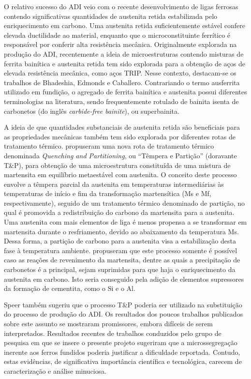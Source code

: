 O relativo sucesso do ADI veio com o recente desenvolvimento de ligas ferrosas contendo significativas quantidades de austenita retida estabilizada pelo enriquecimento em carbono. Uma austenita retida suficientemente estável confere elevada ductilidade ao material, enquanto que o microconstituinte ferrítico é responsável por conferir alta resistência mecânica. Originalmente explorada na produção do ADI, recentemente a ideia de microestruturas contendo misturas de ferrita bainítica e austenita retida tem sido explorada para a obtenção de aços de elevada resistência mecânica, como aços TRIP. Nesse contexto, destacam-se os trabalhos de Bhadeshia, Edmonds e Caballero\cite{Bhadeshia1980a,Caballero2005,Garcia-Mateo2009,GarciaMateo2005}. Contrariando o termo ausferrita utilizado em fundição, o agregado de ferrita bainítica e austenita possui diferentes terminologias na literatura, sendo frequentemente rotulado de bainita isenta de carbonetos (do inglês \textit{carbide-free bainite}), ou superbainita.

A ideia de que quantidades substanciais de austenita retida são beneficiais para as propriedades mecânicas também tem sido explorada por diferentes rotas de tratamento térmico.  propuseram uma nova rota de tratamento térmico denominada \textit{Quenching and Partitioning}, ou ``Têmpera e Partição'' (doravante T\&P), para obtenção de uma microestrutura constituída de uma mistura de martensita em equilíbrio metaestável com austenita. O conceito deste processo envolve a têmpera parcial da austenita em temperaturas intermediárias às temperaturas de início e fim da transformação martensítica (Ms e Mf, respectivamente), seguido de um tratamento térmico denominado de partição, no qual é promovida a redistribuição do carbono da martensita para a austenita. Uma austenita com mais elementos de liga é menos propensa a se transformar em martensita durante o resfriamento, devido ao abaixamento da temperatura Ms. Dessa forma, a partição de carbono para a austenita visa a estabilização desta fase à temperatura ambiente.  propuseram que este processo somente é possível caso as reações de revenimento da martensita, dentre as quais a precipitação de carbonetos é a principal, sejam suprimidas para que haja o enriquecimento da austenita em carbono. Isto seria conseguido pela adição de elementos supressores da formação de cementita, como o Si e o Al.

Speer também sugeriu que o processo T\&P poderia ser utilizado na substituição do processo de produção do ADI. Os resultados dos poucos trabalhos publicados sobre este assunto se mostraram promissores, embora difíceis de serem interpretados\cite{Speer2004}. Resultados recentes de trabalhos conduzidos pelo grupo de pesquisa em que se insere o presente projeto sugeriram que a microssegregação inerente aos ferros fundidos poderia justificar a dificuldade reportada. Contudo, estas evidências, de significativa importância científica e tecnológica, carecem de caracterização e análise minuciosa\cite{Silva2013}.

